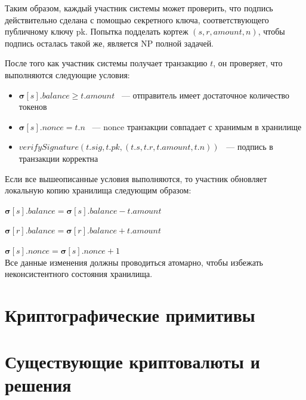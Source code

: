 \noindent Таким образом, каждый участник системы может проверить, что подпись действительно сделана с помощью секретного ключа, соответствующего публичному ключу pk. Попытка подделать кортеж $(s, r, amount, n)$, чтобы подпись осталась такой же, является NP полной задачей.

После того как участник системы получает транзакцию $t$, он проверяет, что выполняются следующие условия:
\begin{itemize}
\item $\boldsymbol{\sigma}[s].balance \ge t.amount$ ~--- отправитель имеет достаточное количество токенов
\item $\boldsymbol{\sigma}[s].nonce = t.n$ ~--- nonce транзакции совпадает с хранимым в хранилище
\item $verifySignature(t.sig, t.pk, (t.s, t.r, t.amount, t.n))$ ~--- подпись в транзакции корректна
\end{itemize}

Если все вышеописанные условия выполняются, то участник обновляет локальную копию хранилища следующим образом:

$\boldsymbol{\sigma}[s].balance = \boldsymbol{\sigma}[s].balance - t.amount$

$\boldsymbol{\sigma}[r].balance = \boldsymbol{\sigma}[r].balance + t.amount$

$\boldsymbol{\sigma}[s].nonce = \boldsymbol{\sigma}[s].nonce + 1$\\
Все данные изменения должны проводиться атомарно, чтобы избежать неконсистентного состояния хранилища.


\section{Криптографические примитивы}

\section{Существующие криптовалюты и решения}

